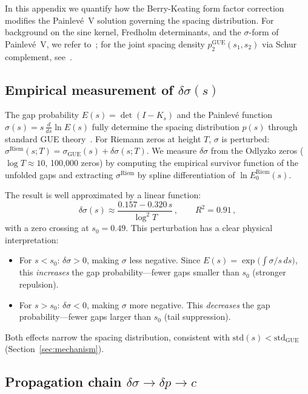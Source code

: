 \documentclass[11pt]{article}
\theoremstyle{plain}
\theoremstyle{remark}
\begin{document}
In this appendix we quantify how the Berry-Keating form factor correction
modifies the Painlev\'e~V solution governing the spacing distribution.
For background on the sine kernel, Fredholm determinants, and the
$\sigma$-form of Painlev\'e~V, we refer to~\cite{tracywidom1994,
jimbo1981}; for the joint spacing density
$p_2^{\mathrm{GUE}}(s_1,s_2)$ via Schur complement,
see~\cite{alarcon2026b, bornemann2010}.

\subsection{Empirical measurement of $\delta\sigma(s)$}

The gap probability $E(s) = \det(I - K_s)$ and the Painlev\'e function
$\sigma(s) = s\,\frac{d}{ds}\ln E(s)$ fully determine the spacing
distribution $p(s)$ through standard GUE
theory~\cite{tracywidom1994, jimbo1981}. For Riemann zeros at height $T$,
$\sigma$ is perturbed:
$\sigma^{\mathrm{Riem}}(s;T) = \sigma_{\mathrm{GUE}}(s) + \delta\sigma(s;T)$.
We measure $\delta\sigma$ from the Odlyzko zeros ($\log T \approx 10$,
100{,}000 zeros) by computing the empirical survivor function of the
unfolded gaps and extracting $\sigma^{\mathrm{Riem}}$ by spline
differentiation of $\ln E_0^{\mathrm{Riem}}(s)$.

The result is well approximated by a linear function:
\begin{equation}
\delta\sigma(s) \approx \frac{0.157 - 0.320\,s}{\log^2 T}\,,
\qquad R^2 = 0.91\,,
\label{eq:dsigma}
\end{equation}
with a zero crossing at $s_0 = 0.49$. This perturbation has a clear
physical interpretation:
\begin{itemize}
\item For $s < s_0$: $\delta\sigma > 0$, making $\sigma$ less negative.
Since $E(s) = \exp\!\bigl(\int \sigma/s\,ds\bigr)$, this \emph{increases}
the gap probability---fewer gaps smaller than $s_0$ (stronger repulsion).
\item For $s > s_0$: $\delta\sigma < 0$, making $\sigma$ more negative.
This \emph{decreases} the gap probability---fewer gaps larger than $s_0$
(tail suppression).
\end{itemize}
Both effects narrow the spacing distribution, consistent with
$\mathrm{std}(s) < \mathrm{std}_{\mathrm{GUE}}$ (Section~\ref{sec:mechanism}).

\subsection{Propagation chain $\delta\sigma \to \delta p \to c$}
\end{document}
